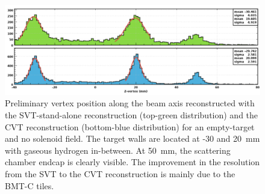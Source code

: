 \begin{figure}[htb]
 \includegraphics[width=1.0\columnwidth,keepaspectratio]{images/NIM_SVTvsCVT.png}
 \caption{Preliminary vertex position along the beam axis reconstructed with the SVT-stand-alone reconstruction
   (top-green distribution) and the CVT reconstruction (bottom-blue distribution) for an empty-target and no solenoid field.
   The target walls are located at -30 and 20~mm with gaseous hydrogen in-between. At 50~mm, the scattering chamber
   endcap is clearly visible. The improvement in the resolution from the SVT to the CVT reconstruction is mainly due to the
   BMT-C tiles.}
 \label{fig:mm-zvertex}
\end{figure}

